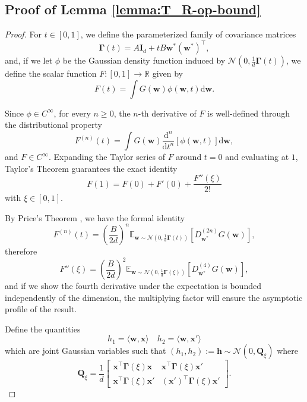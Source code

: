 \subsection{Proof of Lemma \ref{lemma:T_R-op-bound}}\label{app:lemma-T_R-op-bound}
\begin{proof}
    
    For $t \in [0, 1]$, we define the parameterized family of covariance matrices
    \[
        \bm \Gamma(t) = A \bm I_d + t B \bm w^* (\bm w^*)^\top,
    \]
    and, if we let $\phi$ be the Gaussian density function induced by $\mathcal N(0, \frac{1}{d} \bm \Gamma(t))$, we define the scalar function $F:[0,1] \to \mathbb R$ given by
    \[
        F(t) = \int G(\bm w)\phi(\bm w, t)\mathrm d \bm w.
    \]
    
    Since $\phi \in C^\infty$, for every $n \geq 0$, the $n$-th derivative of $F$ is well-defined through the distributional property
    \[
        F^{(n)}(t) = \int G(\bm w)\frac{\mathrm d^n}{\mathrm d t^n}[\phi(\bm w, t)]\mathrm d \bm w,
    \]
    and $F \in C^\infty$. Expanding the Taylor series of $F$ around $t=0$ and evaluating at $1$, Taylor's Theorem guarantees the exact identity
    \[
        F(1) = F(0) + F'(0) + \frac{F''(\xi)}{2!}
    \]
    with $\xi \in [0, 1]$.
        
    By Price's Theorem \citep{Price1958, McMahonPrice1964}, we have the formal identity
    \[
        F^{(n)}(t) = \left(\frac{B}{2d}\right)^n\mathbb E_{\bm w \sim \mathcal N(0, \frac{1}{d}\bm \Gamma(t))}[D_{\bm w^*}^{(2n)} G(\bm w) ],
    \]
    therefore
    \[
        F''(\xi) = \left(\frac{B}{2d}\right)^2 \mathbb E_{\bm w \sim \mathcal N(0, \frac{1}{d}\bm \Gamma(\xi))}[D_{\bm w^*}^{(4)} G(\bm w) ],
    \]
    and if we show the fourth derivative under the expectation is bounded independently of the dimension, the multiplying factor will ensure the asymptotic profile of the result.

    Define the quantities
    \[
        h_1 = \langle\bm w, \bm x\rangle \quad h_2 = \langle\bm w, \bm x'\rangle
    \]
    which are joint Gaussian variables such that $(h_1, h_2) := \bm h \sim \mathcal{N}(0, \bm Q_\xi)$ where
    \[
        \bm Q_\xi = \frac{1}{d}\begin{bmatrix}
            \bm x^\top \bm \Gamma(\xi) \bm x & \bm x^\top \bm \Gamma(\xi) \bm x'\\
            \bm x^\top \bm \Gamma(\xi) \bm x' & (\bm x')^\top \bm \Gamma(\xi) \bm x'
        \end{bmatrix}.
    \]
    

\end{proof}
